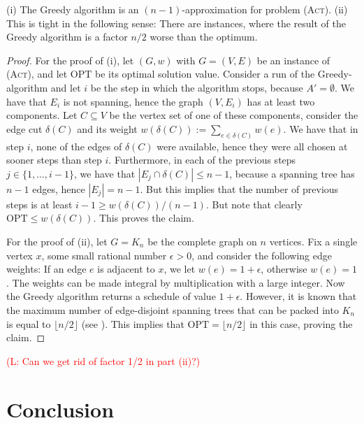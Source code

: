 \documentclass[runningheads]{llncs}
\numberwithin{equation}{section}
\newcommand{\set}[1]{\{ #1 \}}
\newcommand{\fromto}[2]{\set{#1, \ldots, #2}}
\newcommand{\comment}[1]{\textcolor{red}{(L: #1)}}
\newcommand{\act}{\textsc{(Act)}}
\begin{document}
\begin{theorem}
(i) The Greedy algorithm is an $(n-1)$-approximation for problem {\act}.
(ii) This is tight in the following sense: There are instances, where the result of the Greedy algorithm is a factor $n/2$ worse than the optimum.
\end{theorem}
\begin{proof}
For the proof of (i), let $(G, w)$ with $G = (V, E)$ be an instance of {\act}, and let $\text{OPT}$ be its optimal solution value. Consider a run of the Greedy-algorithm and let $i$ be the step in which the algorithm stops, because $A' = \emptyset$. We have that $E_i$ is not spanning, hence the graph $(V, E_i)$ has at least two components. Let $C \subseteq V$ be the vertex set of one of these components, consider the edge cut $\delta(C)$ and its weight $w(\delta(C)) := \sum_{e \in \delta(C)}w(e)$. We have that in step $i$, none of the edges of $\delta(C)$ were available, hence they were all chosen at sooner steps than step $i$. Furthermore, in each of the previous steps $j \in \fromto{1}{i-1}$, we have that $|E_j \cap \delta(C)| \leq n-1$, because a spanning tree has $n-1$ edges, hence $|E_j| = n-1$. But this implies that the number of previous steps is at least $i - 1 \geq w(\delta(C)) / (n-1)$. But note that clearly   $\text{OPT} \leq w(\delta(C))$. This proves the claim.

For the proof of (ii), let $G = K_n$ be the complete graph on $n$ vertices. Fix a single vertex $x$, some small rational number $\epsilon > 0$, and consider the following edge weights: If an edge $e$ is adjacent to $x$, we let $w(e) = 1 + \epsilon$, otherwise $w(e) = 1$. The weights can be made integral by multiplication with a large integer. Now the Greedy algorithm returns a schedule of value $1 + \epsilon$. However, it is known that the maximum number of edge-disjoint spanning trees that can be packed into $K_n$ is equal to $\lfloor n/2 \rfloor$ (see \cite{SPTpackingSurvey}). This implies that $\text{OPT} = \lfloor n/2 \rfloor$ in this case, proving the claim.  
\end{proof}
\comment{Can we get rid of factor 1/2 in part (ii)?}


\section{Conclusion}
\end{document}

